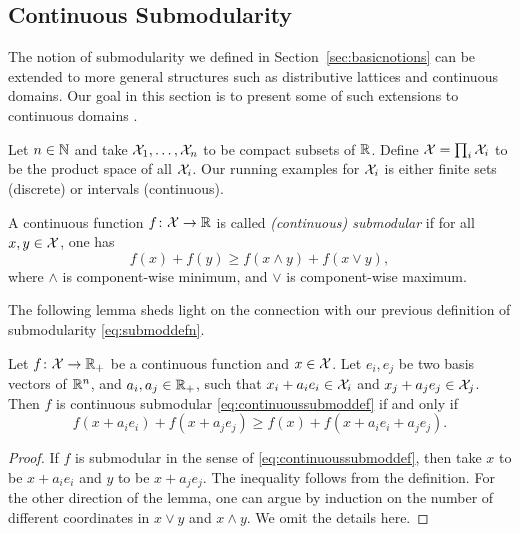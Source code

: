 \subsection{Continuous Submodularity}\label{sec:contsubmod}
The notion of submodularity we defined in Section~\ref{sec:basicnotions} can be extended to more general structures such as distributive lattices and continuous domains. Our goal in this section is to present some of such extensions to continuous domains \citep{bach2016submodular}.

Let $n\in\mathbb{N}$ and take $\mathcal{X}_1, \ldots, \mathcal{X}_n$ to be compact subsets of $\mathbb{R}$. Define $\mathcal{X} = \prod_i \mathcal{X}_i$ to be the product space of all $\mathcal{X}_i$. Our running examples for $\mathcal{X}_i$ is either finite sets (discrete) or intervals (continuous).

\begin{definition}
    A continuous function $f\colon \mathcal{X} \to \mathbb{R}$ is called \emph{(continuous) submodular} if for all $x,y\in\mathcal{X}$, one has 
    \begin{equation}\label{eq:continuoussubmoddef}
        f(x) + f(y) \geq f(x\wedge y) + f(x \vee y),
    \end{equation}
    where $\wedge$ is component-wise minimum, and $\vee$ is component-wise maximum.
\end{definition}

The following lemma sheds light on the connection with our previous definition of submodularity \eqref{eq:submoddefn}.

\begin{lemma}
    Let $f\colon \mathcal{X}\to\mathbb{R}_+$ be a continuous function and $x\in\mathcal{X}$. Let $e_i, e_j$ be two basis vectors of $\mathbb{R}^n$, and $a_i, a_j \in \mathbb{R}_+$, such that $x_i + a_ie_i \in \mathcal{X}_i$ and $x_j + a_je_j \in \mathcal{X}_j$. Then $f$ is continuous submodular \eqref{eq:continuoussubmoddef} if and only if
    \begin{equation}\label{eq:contsubmoddef2}
        f(x + a_ie_i) + f(x + a_je_j) \geq f(x) + f(x + a_ie_i + a_je_j).
    \end{equation}
\end{lemma}
\begin{proof}
    If $f$ is submodular in the sense of \eqref{eq:continuoussubmoddef}, then take $x$ to be $x+a_ie_i$ and $y$ to be $x+a_je_j$. The inequality follows from the definition.  For the other direction of the lemma, one can argue by induction on the number of different coordinates in $x\vee y$ and $x\wedge y$. We omit the details here.
\end{proof}

